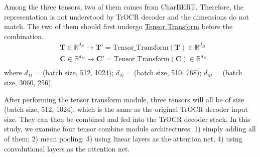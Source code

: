 Among the three tensors, two of them comes from CharBERT. Therefore, the representation is not understood by TrOCR decoder and the dimensions do not match. The two of them should first undergo \hyperref[par:3_tensor_transform]{Tensor Transform} before the combination. 
\begin{equation} \label{eq:3_tensor_combine_transform}
    \begin{split}
        &\mathbf{T}\in \mathbb{R}^{d_N}\to \mathbf{T}' = \text{Tensor\_Transform}(\mathbf{T})\in \mathbb{R}^{d_D}\\
        &\mathbf{C}\in \mathbb{R}^{d_M}\to \mathbf{C}' = \text{Tensor\_Transform}(\mathbf{C})\in \mathbb{R}^{d_D}\\
    \end{split}
\end{equation}
where $d_D$ = (batch size, 512, 1024); $d_N$ = (batch size, 510, 768); $d_M$ = (batch size, 3060, 256).

After performing the tensor transform module, three tensors will all be of size (batch size, 512, 1024), which is the same as the original TrOCR decoder input size. They can then be combined and fed into the TrOCR decoder stack. In this study, we examine four tensor combine module architectures: 1) simply adding all of them; 2) mean pooling; 3) using linear layers as the attention net; 4) using convolutional layers as the attention net.

